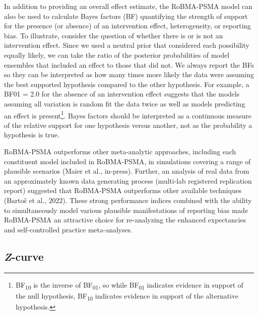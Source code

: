 \documentclass[
  doc, donotrepeattitle,floatsintext]{apa7}
\begin{document}
In addition to providing an overall effect estimate, the RoBMA-PSMA model can also be used to calculate Bayes factors (BF) quantifying the strength of support for the presence (or absence) of an intervention effect, heterogeneity, or reporting bias. To illustrate, consider the question of whether there is or is not an intervention effect. Since we used a neutral prior that considered each possibility equally likely, we can take the ratio of the posterior probabilities of model ensembles that included an effect to those that did not. We always report the BFs so they can be interpreted as how many times more likely the data were assuming the best supported hypothesis compared to the other hypothesis. For example, a BF01 = 2.0 for the absence of an intervention effect suggests that the models assuming all variation is random fit the data twice as well as models predicting an effect is present\footnote{BF\textsubscript{10} is the inverse of BF\textsubscript{01}, so while BF\textsubscript{01} indicates evidence in support of the null hypothesis, BF\textsubscript{10} indicates evidence in support of the alternative hypothesis.}. Bayes factors should be interpreted as a continuous measure of the relative support for one hypothesis versus another, not as the probability a hypothesis is true.

RoBMA-PSMA outperforms other meta-analytic approaches, including each constituent model included in RoBMA-PSMA, in simulations covering a range of plausible scenarios (Maier et al., in-press). Further, an analysis of real data from an approximately known data generating process (multi-lab registered replication report) suggested that RoBMA-PSMA outperforms other available techniques (Bartoš et al., 2022). These strong performance indices combined with the ability to simultaneously model various plausible manifestations of reporting bias made RoBMA-PSMA an attractive choice for re-analyzing the enhanced expectancies and self-controlled practice meta-analyses.

\hypertarget{z-curve}{%
\subsection{\texorpdfstring{\emph{Z}-curve}{Z-curve}}\label{z-curve}}
\end{document}
